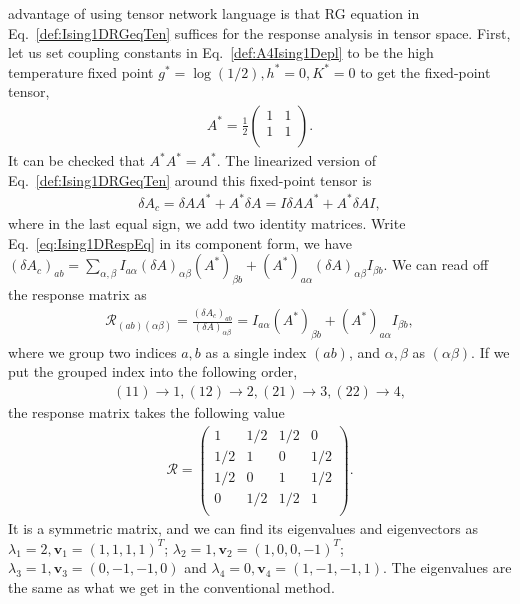\documentclass[aps,prb,reprint,superscriptaddress]{revtex4-2}
\begin{document}
advantage of using tensor network language is that RG equation in
Eq.~\eqref{def:Ising1DRGeqTen} suffices for the response analysis in
tensor space. First, let us set coupling constants in
Eq.~\eqref{def:A4Ising1Depl} to be the high temperature fixed point
$g^* = \log{\left(1/2\right)}, h^*=0, K^* = 0$ to get the fixed-point
tensor,
%
\begin{align}\label{eq:fixedA4Ising1D}
    A^* = \frac{1}{2}
\begin{pmatrix}
    1 & 1 \\
    1 & 1 \\
\end{pmatrix}.
\end{align}
%
It can be checked that $A^* A^* = A^*$. The linearized version of
Eq.~\eqref{def:Ising1DRGeqTen} around this fixed-point tensor is
%
\begin{align}\label{eq:Ising1DRespEq}
    \delta A_c = \delta A A^* + A^* \delta A = I \delta A A^* + A^*
    \delta A I,
\end{align}
%
where in the last equal sign, we add two identity matrices. Write
Eq.~\eqref{eq:Ising1DRespEq} in its component form, we have
$\left(\delta A_c\right)_{ab} =
\sum_{\alpha,\beta}I_{a\alpha}\left(\delta A\right)_{\alpha\beta}
\left(A^*\right)_{\beta b} + \left(A^*\right)_{a\alpha} \left(\delta
A\right)_{\alpha \beta} I_{\beta b}$. We can read off the response
matrix as
%
\begin{align}\label{eq:Ising1DRespMat}
    \mathcal{R}_{(ab)(\alpha \beta)} = \frac{\left(\delta
    A_c\right)_{ab}}{\left(\delta A\right)_{\alpha \beta}} =
    I_{a\alpha}\left(A^*\right)_{\beta b} + \left(A^*\right)_{a\alpha}
    I_{\beta b},
\end{align}
%
where we group two indices $a,b$ as a single index $(ab)$, and
$\alpha,\beta$ as $(\alpha\beta)$. If we put the grouped index into the
following order,
%
\begin{align}\label{def:orderConvention}
    (11) \rightarrow 1, (12) \rightarrow 2, (21) \rightarrow 3, (22)
    \rightarrow 4,
\end{align}
%
the response matrix takes the following value
%
\begin{align}\label{eq:Ising1DRespMatNum}
    \mathcal{R} = 
\begin{pmatrix}
    1 & 1/2 & 1/2 & 0 \\
    1/2 & 1 & 0 & 1/2 \\
    1/2 & 0 & 1 & 1/2 \\
    0 & 1/2 & 1/2 & 1 \\
\end{pmatrix}.
\end{align}
%
It is a symmetric matrix, and we can find its eigenvalues and
eigenvectors as $\lambda_1 = 2,\mathbf{v}_1 = (1,1,1,1)^T$; $\lambda_2 =
1,\mathbf{v}_2 = (1,0,0,-1)^T$; $\lambda_3 =1, \mathbf{v}_3 =
(0,-1,-1,0)$ and $\lambda_4 = 0, \mathbf{v}_4 = (1,-1,-1,1)$. The
eigenvalues are the same as what we get in the conventional method. 
%
\end{document}
